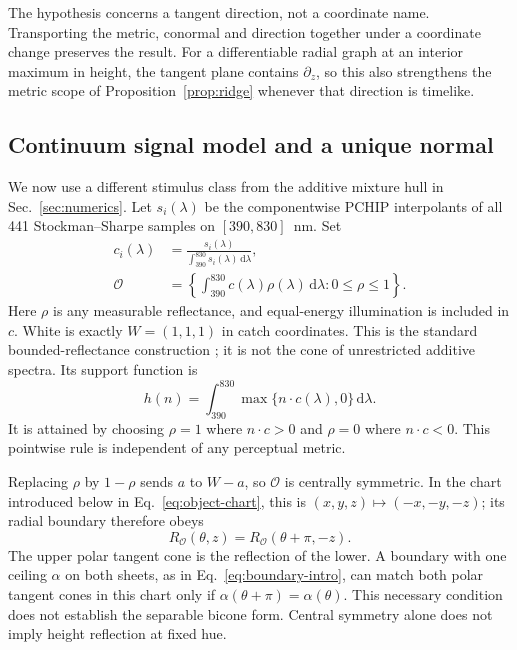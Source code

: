 \documentclass[11pt,letterpaper]{article}
\theoremstyle{plain}
\newcommand{\dd}{\mathrm{d}}
\begin{document}
The hypothesis concerns a tangent direction, not a coordinate name. Transporting the metric, conormal and direction together under a coordinate change preserves the result. For a differentiable radial graph at an interior maximum in height, the tangent plane contains $\partial_z$, so this also strengthens the metric scope of Proposition~\ref{prop:ridge} whenever that direction is timelike.

\subsection{Continuum signal model and a unique normal}
We now use a different stimulus class from the additive mixture hull in Sec.~\ref{sec:numerics}. Let $s_i(\lambda)$ be the componentwise PCHIP interpolants of all 441 Stockman--Sharpe samples on $[390,830]$~nm. Set
\begin{equation}
 \begin{aligned}
 c_i(\lambda)&=\frac{s_i(\lambda)}{\int_{390}^{830}s_i(\lambda)\,\dd\lambda},\\
 \mathcal O&=\left\{\int_{390}^{830}c(\lambda)\rho(\lambda)\,\dd\lambda:
 0\leq\rho\leq1\right\}.
 \end{aligned}
 \label{eq:object-solid}
\end{equation}
Here $\rho$ is any measurable reflectance, and equal-energy illumination is included in $c$. White is exactly $W=(1,1,1)$ in catch coordinates. This is the standard bounded-reflectance construction \cite{Logvinenko2025}; it is not the cone of unrestricted additive spectra. Its support function is
\begin{equation}
 h(n)=\int_{390}^{830}\max\{n\cdot c(\lambda),0\}\,\dd\lambda.
 \label{eq:object-support}
\end{equation}
It is attained by choosing $\rho=1$ where $n\cdot c>0$ and $\rho=0$ where $n\cdot c<0$. This pointwise rule is independent of any perceptual metric.

Replacing $\rho$ by $1-\rho$ sends $a$ to $W-a$, so $\mathcal O$ is centrally symmetric. In the chart introduced below in Eq.~\eqref{eq:object-chart}, this is $(x,y,z)\mapsto(-x,-y,-z)$; its radial boundary therefore obeys
\begin{equation}
 R_{\mathcal O}(\theta,z)=R_{\mathcal O}(\theta+\pi,-z).
 \label{eq:object-complement}
\end{equation}
The upper polar tangent cone is the reflection of the lower. A boundary with one ceiling $\alpha$ on both sheets, as in Eq.~\eqref{eq:boundary-intro}, can match both polar tangent cones in this chart only if $\alpha(\theta+\pi)=\alpha(\theta)$. This necessary condition does not establish the separable bicone form. Central symmetry alone does not imply height reflection at fixed hue.
\end{document}
